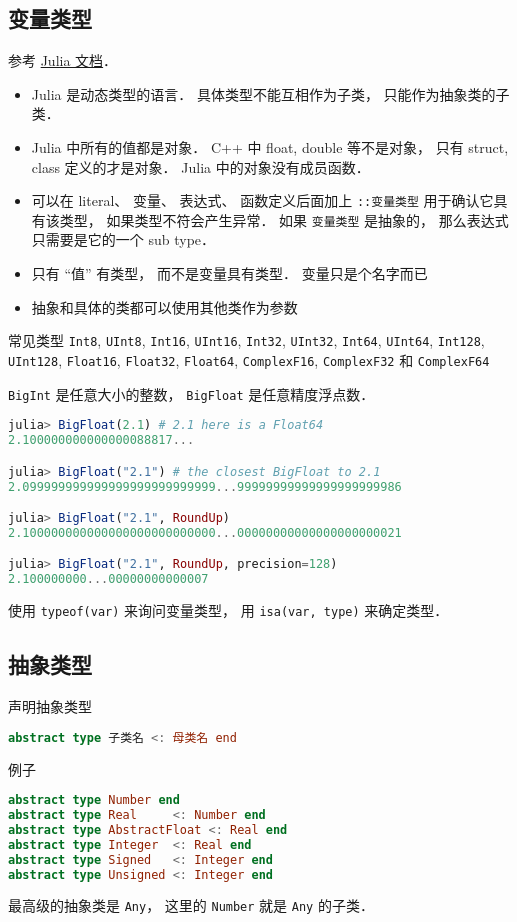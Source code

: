
\subsection{变量类型}

参考 \href{https://docs.julialang.org/en/v1/manual/types/#man-declared-types}{Julia 文档}．
\begin{itemize}
\item Julia 是动态类型的语言． 具体类型不能互相作为子类， 只能作为抽象类的子类．
\item Julia 中所有的值都是对象． C++ 中 float, double 等不是对象， 只有 struct, class 定义的才是对象． Julia 中的对象没有成员函数．
\item 可以在 literal、 变量、 表达式、 函数定义后面加上 \verb|::变量类型| 用于确认它具有该类型， 如果类型不符会产生异常． 如果 \verb|变量类型| 是抽象的， 那么表达式只需要是它的一个 sub type．
\item 只有 “值” 有类型， 而不是变量具有类型． 变量只是个名字而已
\item 抽象和具体的类都可以使用其他类作为参数
\end{itemize}

常见类型
\verb|Int8|, \verb|UInt8|, \verb|Int16|, \verb|UInt16|, \verb|Int32|, \verb|UInt32|, \verb|Int64|, \verb|UInt64|, \verb|Int128|, \verb|UInt128|, \verb|Float16|, \verb|Float32|, \verb|Float64|, \verb|ComplexF16|, \verb|ComplexF32| 和 \verb|ComplexF64|

\verb|BigInt| 是任意大小的整数， \verb|BigFloat| 是任意精度浮点数．

\begin{lstlisting}[language=julia]
julia> BigFloat(2.1) # 2.1 here is a Float64
2.100000000000000088817...

julia> BigFloat("2.1") # the closest BigFloat to 2.1
2.099999999999999999999999999...99999999999999999999986

julia> BigFloat("2.1", RoundUp)
2.100000000000000000000000000...00000000000000000000021

julia> BigFloat("2.1", RoundUp, precision=128)
2.100000000...00000000000007
\end{lstlisting}

使用 \verb|typeof(var)| 来询问变量类型， 用 \verb|isa(var, type)| 来确定类型．

\subsection{抽象类型}
声明抽象类型
\begin{lstlisting}[language=julia]
abstract type 子类名 <: 母类名 end
\end{lstlisting}
例子
\begin{lstlisting}[language=julia]
abstract type Number end
abstract type Real     <: Number end
abstract type AbstractFloat <: Real end
abstract type Integer  <: Real end
abstract type Signed   <: Integer end
abstract type Unsigned <: Integer end
\end{lstlisting}
最高级的抽象类是 \verb|Any|， 这里的 \verb|Number| 就是 \verb|Any| 的子类．

